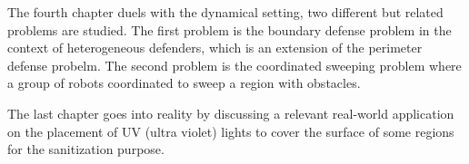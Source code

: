 \begin{my_abstract}
The fourth chapter duels with the dynamical setting, two different but related problems are studied. 
The first problem is the boundary defense problem in the context of heterogeneous defenders,
which is an extension of the perimeter defense probelm. 
The second problem is the coordinated sweeping problem where a group of robots coordinated to sweep a region with obstacles. 

The last chapter goes into reality by discussing a relevant real-world application on the placement of UV (ultra violet) lights
to cover the surface of some regions for the sanitization purpose. 

\end{my_abstract}
